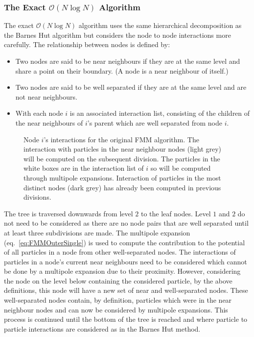 \subsubsection{\texorpdfstring{The Exact $\mathcal{O}(N\log N)$ Algorithm}{The Exact O(N log N) Algorithm}} \label{subsec:ExactNlogN}
The exact $\mathcal{O}(N\log N)$ algorithm uses the same hierarchical decomposition as the Barnes Hut algorithm but considers the node to node interactions more carefully. The relationship between nodes is defined by:
\begin{itemize}
    \item Two nodes are said to be near neighbours if they are at the same level and share a point on their boundary. (A node is a near neighbour of itself.)
    \item Two nodes are said to be well separated if they are at the same level and are not near neighbours.
    \item With each node $i$ is an associated interaction list, consisting of the children of the near neighbours of $i$’s parent which are well separated from node $i$.
\end{itemize}

\begin{figure}
    \centering
        \resizebox{.4\linewidth}{!}{}
    \caption[Node $i$'s interactions for the original FMM algorithm.]{Node $i$'s interactions for the original FMM algorithm. The interaction with particles in the near neighbour nodes (light grey) will be computed on the subsequent division. The particles in the white boxes are in the interaction list of $i$ so will be computed through multipole expansions. Interaction of particles in the most distinct nodes (dark grey) has already been computed in previous divisions.}
    \label{fig:FMMDecomp}
\end{figure}

The tree is traversed downwards from level $2$ to the leaf nodes. Level $1$ and $2$ do not need to be considered as there are no node pairs that are well separated until at least three subdivisions are made. The multipole expansion (eq.~\ref{eq:FMMOuterSingle}) is used to compute the contribution to the potential of all particles in a node from other well-separated nodes. The interactions of particles in a node's current near neighbours need to be considered which cannot be done by a multipole expansion due to their proximity. However, considering the node on the level below containing the considered particle, by the above definitions, this node will have a new set of near and well-separated nodes. These well-separated nodes contain, by definition, particles which were in the near neighbour nodes and can now be considered by multipole expansions. This process is continued until the bottom of the tree is reached and where particle to particle interactions are considered as in the Barnes Hut method. 

